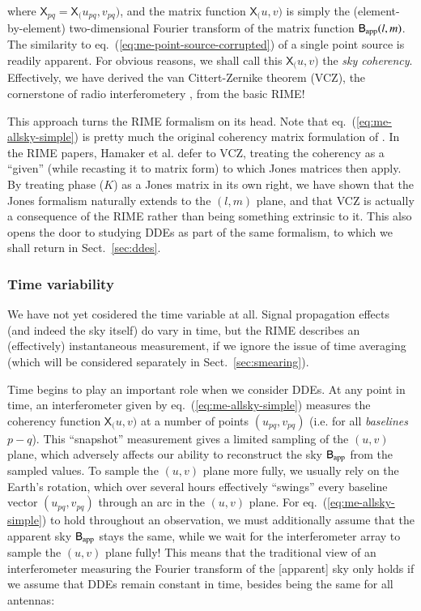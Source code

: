 \documentclass[]{aa}
\newcommand{\coh}[2]{\mathsf{{#1}}_{{#2}}}
\begin{document}
where $\coh{X}{pq} = \coh{X}(u_{pq},v_{pq})$, and the matrix function $\coh{X}(u,v)$ is simply the (element-by-element) two-dimensional Fourier transform of the matrix function $\coh{B}{\rm app}(l,m)$. The similarity to eq.~(\ref{eq:me-point-source-corrupted}) of a single point source is readily apparent. For obvious reasons, we shall call this $\coh{X}(u,v)$ the {\em sky coherency}. Effectively, we have derived the van Cittert-Zernike theorem (VCZ), the cornerstone of radio interferometery \citep[Sect.~14.1]{tms}, from the basic RIME! 

This approach turns the RIME formalism on its head. Note that eq.~(\ref{eq:me-allsky-simple}) is pretty much the original coherency matrix formulation of \citet[eq.~2]{ME4}. In the RIME papers, Hamaker et al. defer to VCZ, treating the coherency as a ``given'' (while recasting it to matrix form) to which Jones matrices then apply. By treating phase ($K$) as a Jones matrix in its own right, we have shown that the Jones formalism naturally extends to the $(l,m)$ plane, and that VCZ is actually a consequence of the RIME rather than being something extrinsic to it. This also opens the door to studying DDEs as part of the same formalism, to which we shall return in Sect.~\ref{sec:ddes}.

\subsubsection{Time variability}

We have not yet cosidered the time variable at all. Signal propagation effects (and indeed the sky itself) do vary in time, but the RIME describes an (effectively) instantaneous measurement, if we ignore the issue of time averaging (which will be considered separately in Sect.~\ref{sec:smearing}). 

Time begins to play an important role when we consider DDEs. At any point in time, an interferometer given by eq.~(\ref{eq:me-allsky-simple}) measures the coherency function $\coh{X}(u,v)$ at a number of points $(u_{pq},v_{pq})$ (i.e. for all {\em baselines} $p-q$). This ``snapshot'' measurement gives a limited sampling of the $(u,v)$ plane, which adversely affects our ability to reconstruct the sky $\coh{B}{\rm app}$ from the sampled values. To sample the $(u,v)$ plane more fully, we usually rely on the Earth's rotation, which over several hours effectively ``swings'' every baseline vector $(u_{pq},v_{pq})$ through an arc in the $(u,v)$ plane. For eq.~(\ref{eq:me-allsky-simple}) to hold throughout an observation, we must additionally assume that the apparent sky $\coh{B}{\rm app}$ stays the same, while we wait for the interferometer array to sample the $(u,v)$ plane fully! This means that the traditional view of an interferometer measuring the Fourier transform of the [apparent] sky only holds if we assume that DDEs remain constant in time, besides being the same for all antennas:
\end{document}
